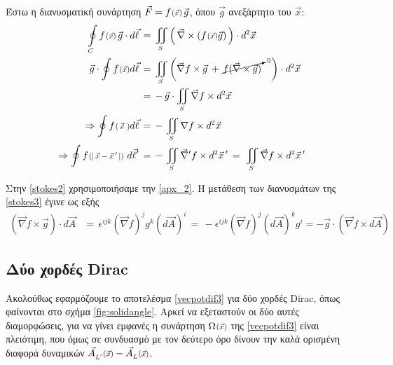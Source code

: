 Έστω η διανυσματική συνάρτηση $\vec{F} = \scafun{f}{\vec{x}}\,\vec{g}$, όπου $\vec{g}$ ανεξάρτητο του $\vec{x}$:
\begin{align}
    \oint\limits\subscr{C} \scafun{f}{\vec{x}}\,\vec{g}\cdot d\vec{\ell}\, & = \, \iint\subscr{S}\left(\,\vec{\nabla}\times (\scafun{f}{\vec{x}}\vec{g})\,\right)\cdot d\superscr{2}\vec{x}\label{stokes1}\\
    \vec{g}\cdot \oint \scafun{f}{\vec{x}} d\vec{\ell} \, &= \, \iint\subscr{S}\left(\vec{\nabla} f \times\vec{g}\,+\,\cancelto{\text{\scalebox{0.7}{0}}}{f(\vec{\nabla}\times\vec{g})}\quad\right)\cdot d\superscr{2}\vec{x} \label{stokes2}\\
    &= \, -\,\vec{g}\cdot\iint\subscr{S}\vec{\nabla} f \times d\superscr{2}\vec{x} \label{stokes3}\\
    \Rightarrow \oint \scafun{f}{\,\vec{x}\,\,} d\vec{\ell} \, &= \, -\, \iint\subscr{S} \nabla f \times d\superscr{2}\vec{x}\label{stokes4}\\
    \Rightarrow \oint \scafun{f}{|\,\vec{x}-\vec{x}\,'\,|}\,\,d\vec{\ell}' \, &= \, -\,\iint\subscr{S}\vec{\nabla} ' f \times d\superscr{2}\vec{x}\,' \, = \, \,\iint\subscr{S}\vec{\nabla} f \times d\superscr{2}\vec{x}\,' \label{stokes5}
\end{align}



\begin{note}[\ref{stokes1}-\ref{stokes4}]
    Στην \eqref{stokes2} χρησιμοποιήσαμε την \eqref{apx_2}. Η μετάθεση των διανυσμάτων της \eqref{stokes3} έγινε ως εξής 
    \begin{align*}
        \left(\vec{\nabla} f \times \vec{g}\right)\cdot d \vec{A} &= \, \epsilon^{ijk} \left( \vec{\nabla} f \right)^j g^k\left( d\vec{A}\right)^i \, = \, -\epsilon^{ijk} \left( \vec{\nabla} f \right)^j \left( d\vec{A}\right)^k g^i = -\vec{g}\cdot\left(\vec{\nabla} f \times d\vec{A}\right)
    \end{align*}
\end{note}

\newpage

\subsection{Δύο χορδές Dirac}\label{apx23}
Ακολούθως εφαρμόζουμε το αποτελέσμα \eqref{vecpotdif3} για δύο χορδές Dirac, όπως φαίνονται στο σχήμα \ref{fig:solidangle}. Αρκεί να εξεταστούν οι δύο αυτές διαμορφώσεις, για να γίνει εμφανές η συνάρτηση $\scafun{\Omega}{\vec{x}}$ της \eqref{vecpotdif3} είναι πλειότιμη, που όμως σε συνδυασμό με τον δεύτερο όρο δίνουν την καλά ορισμένη διαφορά δυναμικών $ \vecfun[L']{A}{\vec{x}} - \vecfun[L]{A}{\vec{x}}$.

